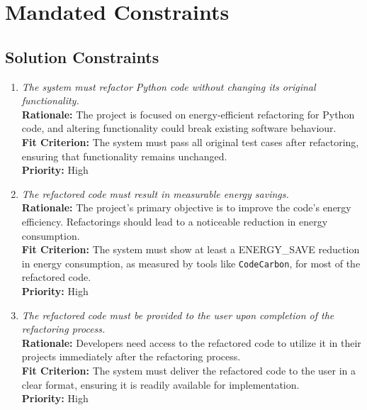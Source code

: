 \documentclass[12pt]{article}
\begin{document}
\section{Mandated Constraints}
\subsection{Solution Constraints}
\begin{enumerate}[label=MD-SL \arabic*., wide=0pt, leftmargin=*]
  \item \emph{The system must refactor Python code without changing
    its original functionality.}\\[2mm]
    {\bf Rationale:} The project is focused on energy-efficient
    refactoring for Python code, and altering functionality could
    break existing software behaviour.\\
    {\bf Fit Criterion:} The system must pass all original test cases
    after refactoring, ensuring that functionality remains unchanged.\\
    {\bf Priority:} High
  \item \emph{The refactored code must result in measurable energy
    savings.}\\[2mm]
    {\bf Rationale:} The project's primary objective is to improve
    the code's energy efficiency. Refactorings should lead to a
    noticeable reduction in energy consumption.\\
    {\bf Fit Criterion:} The system must show at least a ENERGY\_SAVE
    reduction in energy consumption, as measured by tools like
    \texttt{CodeCarbon}, for most of the refactored code.\\
    {\bf Priority:} High
  \item \emph{The refactored code must be provided to the user upon
    completion of the refactoring process.}\\[2mm]
    {\bf Rationale:} Developers need access to the refactored code to
    utilize it in their projects immediately after the refactoring process.\\
    {\bf Fit Criterion:} The system must deliver the refactored code
    to the user in a clear format, ensuring it is readily available
    for implementation.\\
    {\bf Priority:} High
\end{enumerate}
\end{document}
